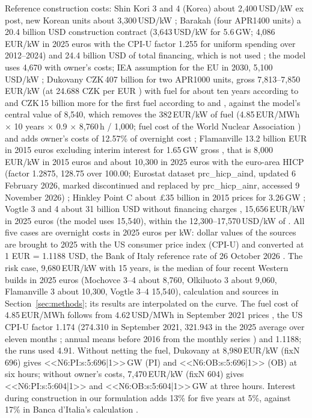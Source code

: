 Reference construction costs: Shin Kori 3 and 4 (Korea) about 2{,}400\,USD/kW ex post, new Korean units about 3{,}300\,USD/kW \citep{HSF2026,KHNP2025}; Barakah (four APR1400 units) a 20.4 billion USD construction contract (3{,}643\,USD/kW for 5.6\,GW; 4{,}086\,EUR/kW in 2025 euros with the CPI-U factor 1.255 for uniform spending over 2012--2024) and 24.4 billion USD of total financing, which is not used \citep{WNAuae}; the model uses 4{,}670 with owner's costs; IEA assumption for the EU in 2030, 5{,}100\,USD/kW \citep{IEA2024WEO}; Dukovany CZK\,407 billion for two APR1000 units, gross 7{,}813--7{,}850\,EUR/kW (at 24.688 CZK per EUR \citep{EurostatFX}) with fuel for about ten years according to \citet{WNNKHNPplans} and CZK\,15 billion more for the first fuel according to \citet{CT24Dukovany} and \citet{ForbesDukovany}, against the model's central value of 8{,}540, which removes the 382\,EUR/kW of fuel (4.85\,EUR/MWh $\times$ 10 years $\times$ 0.9 $\times$ 8{,}760\,h / 1{,}000; fuel cost of the World Nuclear Association \citep{WNAecon}) and adds owner's costs of 12.57\% of overnight cost \citep{INLowner} \citep{Dukovany2024,WNNDukovanySigned2025,EnerdataDukovany2025}; Flamanville 13.2 billion EUR in 2015 euros excluding interim interest \citep{EDFFlamanville2022} for 1.65\,GW gross \citep{Folz2019}, that is 8{,}000\,EUR/kW in 2015 euros and about 10{,}300 in 2025 euros with the euro-area HICP (factor 1.2875, 128.75 over 100.00; Eurostat dataset prc\_hicp\_aind, updated 6 February 2026, marked discontinued and replaced by prc\_hicp\_ainr, accessed 9 November 2026) \citep{EurostatHICP}; Hinkley Point C about \pounds35 billion in 2015 prices for 3.26\,GW \citep{Hinkley2026}; Vogtle 3 and 4 about 31 billion USD without financing charges \citep{EnergytechVogtle,IEEFAVogtle}, 15{,}656\,EUR/kW in 2025 euros (the model uses 15{,}540), within the 12{,}300--17{,}570\,USD/kW of \citet{Lazard2025}. All five cases are overnight costs in 2025 euros per kW: dollar values of the sources are brought to 2025 with the US consumer price index (CPI-U) and converted at 1 EUR = 1.1188 USD, the Bank of Italy reference rate of 26 October 2026 \citep{BancaItaliaFX}. The risk case, 9{,}680\,EUR/kW with 15 years, is the median of four recent Western builds in 2025 euros (Mochovce 3--4 about 8{,}760, Olkiluoto 3 about 9{,}060, Flamanville 3 about 10{,}300, Vogtle 3--4 15{,}540), calculation and sources in Section~\ref{sec:methods}; its results are interpolated on the curve. The fuel cost of 4.85\,EUR/MWh follows from 4.62\,USD/MWh in September 2021 prices \citep{WNAecon}, the US CPI-U factor 1.174 (274.310 in September 2021, 321.943 in the 2025 average over eleven months \citep{BLSCPI}; annual means before 2016 from the monthly series \citep{FREDCPI}) and 1.1188; the runs used 4.91. Without netting the fuel, Dukovany at 8{,}980\,EUR/kW (fixN 696) gives <<N6:PI:s:5:696|1>>\,GW (PI) and <<N6:OB:s:5:696|1>> (OB) at six hours; without owner's costs, 7{,}470\,EUR/kW (fixN 604) gives <<N6:PI:s:5:604|1>> and <<N6:OB:s:5:604|1>>\,GW at three hours. Interest during construction in our formulation adds 13\% for five years at 5\%, against 17\% in Banca d'Italia's calculation \citep{Bankitalia2025}.

